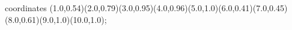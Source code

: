 					coordinates { (1.0,0.54)(2.0,0.79)(3.0,0.95)(4.0,0.96)(5.0,1.0)(6.0,0.41)(7.0,0.45)(8.0,0.61)(9.0,1.0)(10.0,1.0)};